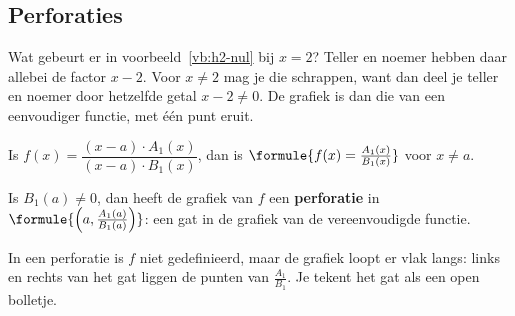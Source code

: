 \begin{oefeningen}
\end{oefeningen}

\subsection{Perforaties}

Wat gebeurt er in voorbeeld~\ref{vb:h2-nul} bij $x = 2$? Teller en noemer hebben daar allebei de factor $x - 2$. Voor $x \neq 2$ mag je die schrappen, want dan deel je teller en noemer door hetzelfde getal $x - 2 \neq 0$. De grafiek is dan die van een eenvoudiger functie, met één punt eruit.

\begin{theorie}
Is $f(x) = \dfrac{(x - a) \cdot A_1(x)}{(x - a) \cdot B_1(x)}$, dan is $\formule{f(x) = \frac{A_1(x)}{B_1(x)}}$ voor $x \neq a$.

Is $B_1(a) \neq 0$, dan heeft de grafiek van $f$ een \textbf{\textcolor{accent}{perforatie}} in $\formule{\Bigl(a, \frac{A_1(a)}{B_1(a)}\Bigr)}$: een gat in de grafiek van de vereenvoudigde functie.
\end{theorie}


In een perforatie is $f$ niet gedefinieerd, maar de grafiek loopt er vlak langs: links en rechts van het gat liggen de punten van $\frac{A_1}{B_1}$. Je tekent het gat als een open bolletje.

